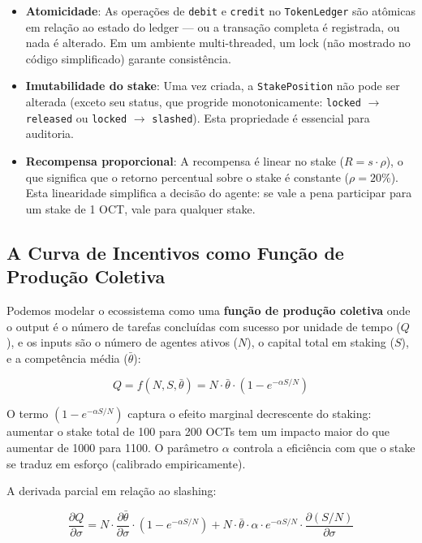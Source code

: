 \begin{itemize}
    \item \textbf{Atomicidade}: As operações de \texttt{debit} e \texttt{credit} no \texttt{TokenLedger} são atômicas em relação ao estado do ledger --- ou a transação completa é registrada, ou nada é alterado. Em um ambiente multi-threaded, um lock (não mostrado no código simplificado) garante consistência.
    
    \item \textbf{Imutabilidade do stake}: Uma vez criada, a \texttt{StakePosition} não pode ser alterada (exceto seu status, que progride monotonicamente: \texttt{locked} $\to$ \texttt{released} ou \texttt{locked} $\to$ \texttt{slashed}). Esta propriedade é essencial para auditoria.
    
    \item \textbf{Recompensa proporcional}: A recompensa é linear no stake ($R = s \cdot \rho$), o que significa que o retorno percentual sobre o stake é constante ($\rho = 20\%$). Esta linearidade simplifica a decisão do agente: se vale a pena participar para um stake de 1 OCT, vale para qualquer stake.
\end{itemize}

\subsection{A Curva de Incentivos como Função de Produção Coletiva}

Podemos modelar o ecossistema como uma \textbf{função de produção coletiva} onde o output é o número de tarefas concluídas com sucesso por unidade de tempo ($Q$), e os inputs são o número de agentes ativos ($N$), o capital total em staking ($S$), e a competência média ($\bar{\theta}$):

\begin{equation}\label{eq:production_function}
Q = f(N, S, \bar{\theta}) = N \cdot \bar{\theta} \cdot \left(1 - e^{-\alpha S / N}\right)
\end{equation}

O termo $(1 - e^{-\alpha S / N})$ captura o efeito marginal decrescente do staking: aumentar o stake total de 100 para 200 OCTs tem um impacto maior do que aumentar de 1000 para 1100. O parâmetro $\alpha$ controla a eficiência com que o stake se traduz em esforço (calibrado empiricamente).

A derivada parcial em relação ao slashing:

\begin{equation}\label{eq:marginal_slashing}
\frac{\partial Q}{\partial \sigma} = N \cdot \frac{\partial \bar{\theta}}{\partial \sigma} \cdot \left(1 - e^{-\alpha S / N}\right) + N \cdot \bar{\theta} \cdot \alpha \cdot e^{-\alpha S / N} \cdot \frac{\partial (S/N)}{\partial \sigma}
\end{equation}

